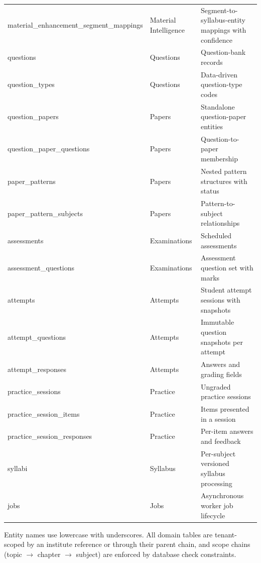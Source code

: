 \begin{longtable}{@{}p{5.4cm}p{3.4cm}p{\dimexpr\textwidth-8.8cm-24pt\relax}@{}}
material\_\hspace{0pt}enhancement\_\hspace{0pt}segment\_\hspace{0pt}mappings & Material Intelligence & Segment-to-syllabus-entity mappings with confidence \\
questions & Questions & Question-bank records \\
question\_types & Questions & Data-driven question-type codes \\
question\_papers & Papers & Standalone question-paper entities \\
question\_paper\_questions & Papers & Question-to-paper membership \\
paper\_patterns & Papers & Nested pattern structures with status \\
paper\_pattern\_subjects & Papers & Pattern-to-subject relationships \\
assessments & Examinations & Scheduled assessments \\
assessment\_questions & Examinations & Assessment question set with marks \\
attempts & Attempts & Student attempt sessions with snapshots \\
attempt\_questions & Attempts & Immutable question snapshots per attempt \\
attempt\_responses & Attempts & Answers and grading fields \\
practice\_sessions & Practice & Ungraded practice sessions \\
practice\_session\_items & Practice & Items presented in a session \\
practice\_session\_responses & Practice & Per-item answers and feedback \\
syllabi & Syllabus & Per-subject versioned syllabus processing \\
jobs & Jobs & Asynchronous worker job lifecycle \\
\bottomrule
\end{longtable}

Entity names use lowercase with underscores. All domain tables are
tenant-scoped by an institute reference or through their parent chain, and
scope chains (topic $\rightarrow$ chapter $\rightarrow$ subject) are enforced
by database check constraints.